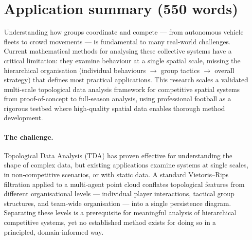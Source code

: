 \section{Application summary (550 words)}

Understanding how groups coordinate and compete --- from autonomous vehicle fleets to crowd movements --- is fundamental to many real-world challenges. Current mathematical methods for analysing these collective systems have a critical limitation: they examine behaviour at a single spatial scale, missing the hierarchical organisation (individual behaviours $\rightarrow$ group tactics $\rightarrow$ overall strategy) that defines most practical applications. This research scales a validated multi-scale topological data analysis framework for competitive spatial systems from proof-of-concept to full-season analysis, using professional football as a rigorous testbed where high-quality spatial data enables thorough method development.

\paragraph{The challenge.}
Topological Data Analysis (TDA) has proven effective for understanding the shape of complex data, but existing applications examine systems at single scales, in non-competitive scenarios, or with static data. A standard Vietoris--Rips filtration applied to a multi-agent point cloud conflates topological features from different organisational levels --- individual player interactions, tactical group structures, and team-wide organisation --- into a single persistence diagram. Separating these levels is a prerequisite for meaningful analysis of hierarchical competitive systems, yet no established method exists for doing so in a principled, domain-informed way.

